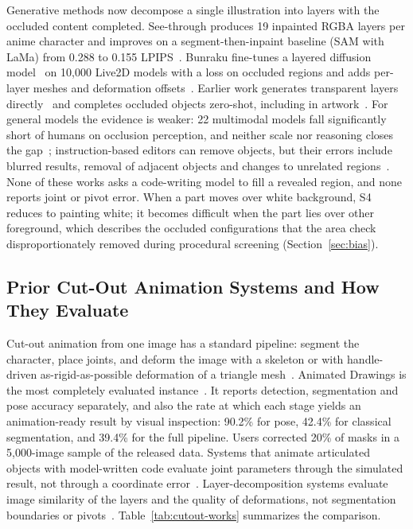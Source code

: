 Generative methods now decompose a single illustration into layers with the occluded content completed. See-through produces 19 inpainted RGBA layers per anime character and improves on a segment-then-inpaint baseline (SAM with LaMa) from 0.288 to 0.155 LPIPS~\citep{lin2026seethrough,suvorov2022lama}. Bunraku fine-tunes a layered diffusion model~\citep{yin2025qwenimagelayered} on 10{,}000 Live2D models with a loss on occluded regions and adds per-layer meshes and deformation offsets~\citep{chen2026bunraku}. Earlier work generates transparent layers directly~\citep{zhang2024layerdiffuse} and completes occluded objects zero-shot, including in artwork~\citep{ozguroglu2024pix2gestalt,ao2025amodal}. For general models the evidence is weaker: 22 multimodal models fall significantly short of humans on occlusion perception, and neither scale nor reasoning closes the gap~\citep{liu2025obench}; instruction-based editors can remove objects, but their errors include blurred results, removal of adjacent objects and changes to unrelated regions~\citep{ye2025imgedit,qian2025giebench}. None of these works asks a code-writing model to fill a revealed region, and none reports joint or pivot error. When a part moves over white background, S4 reduces to painting white; it becomes difficult when the part lies over other foreground, which describes the occluded configurations that the area check disproportionately removed during procedural screening (Section~\ref{sec:bias}).

\subsection{Prior Cut-Out Animation Systems and How They Evaluate}
\label{sec:cutout-puppet}

Cut-out animation from one image has a standard pipeline: segment the character, place joints, and deform the image with a skeleton or with handle-driven as-rigid-as-possible deformation of a triangle mesh~\citep{igarashi2005arap}. Animated Drawings is the most completely evaluated instance~\citep{smith2023animateddrawings}. It reports detection, segmentation and pose accuracy separately, and also the rate at which each stage yields an animation-ready result by visual inspection: 90.2\% for pose, 42.4\% for classical segmentation, and 39.4\% for the full pipeline. Users corrected 20\% of masks in a 5{,}000-image sample of the released data. Systems that animate articulated objects with model-written code evaluate joint parameters through the simulated result, not through a coordinate error~\citep{le2025articulateanything}. Layer-decomposition systems evaluate image similarity of the layers and the quality of deformations, not segmentation boundaries or pivots~\citep{lin2026seethrough,chen2026bunraku}. Table~\ref{tab:cutout-works} summarizes the comparison.

